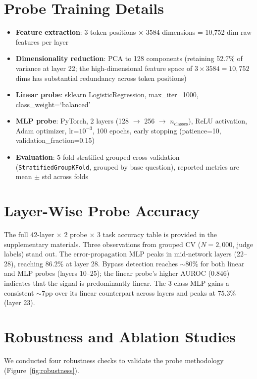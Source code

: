 \documentclass[10pt]{article} %
\begin{document}
\section{Probe Training Details}
\label{app:probes}

\begin{itemize}
\item \textbf{Feature extraction}: 3 token positions $\times$ 3584 dimensions = 10,752-dim raw features per layer
\item \textbf{Dimensionality reduction}: PCA to 128 components (retaining 52.7\% of variance at layer 22; the high-dimensional feature space of $3 \times 3584 = 10{,}752$ dims has substantial redundancy across token positions)
\item \textbf{Linear probe}: sklearn LogisticRegression, max\_iter=1000, class\_weight=`balanced'
\item \textbf{MLP probe}: PyTorch, 2 layers (128 $\to$ 256 $\to$ $n_\text{classes}$), ReLU activation, Adam optimizer, lr=$10^{-3}$, 100 epochs, early stopping (patience=10, validation\_fraction=0.15)
\item \textbf{Evaluation}: 5-fold stratified grouped cross-validation (\texttt{StratifiedGroupKFold}, grouped by base question), reported metrics are mean $\pm$ std across folds
\end{itemize}

\section{Layer-Wise Probe Accuracy}
\label{app:layers}

The full 42-layer $\times$ 2 probe $\times$ 3 task accuracy table is provided in the supplementary materials. Three observations from grouped CV ($N = 2{,}000$, judge labels) stand out. The error-propagation MLP peaks in mid-network layers (22--28), reaching $86.2\%$ at layer 28. Bypass detection reaches $\sim$$80\%$ for both linear and MLP probes (layers 10--25); the linear probe's higher AUROC ($0.846$) indicates that the signal is predominantly linear. The 3-class MLP gains a consistent $\sim$$7$pp over its linear counterpart across layers and peaks at $75.3\%$ (layer 23).

\section{Robustness and Ablation Studies}
\label{app:ablation}

We conducted four robustness checks to validate the probe methodology (Figure~\ref{fig:robustness}).
\end{document}
